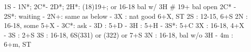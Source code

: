 1S - 1N*; 2C*- 2D*; 
2H*: (18)19+; or 16-18 bal w/ 3H  # 19+ bal open 2C*
   - 2S*: waiting
   		- 2N+: same as below
   - 3X : nat good 6+X, ST
2S : 12-15, 6+S
2N : 16-18, some 5+X
   - 3C*: ask
		- 3D : 5+D
		- 3H : 5+H
		- 3S*: 5+C
3X : 16-18, 4+X
   - 3S : 2+S
3S : 16-18, 6S(331) or (322) or 7+S
3N : 16-18, bal w/o 3H
   - 4m : 6+m, ST
